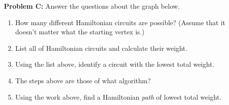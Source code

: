 \documentclass[11pt, oneside]{article}   	%
\begin{document}
	\vfill
	
\textbf{Problem C:} Answer the questions about the graph below.\\
\begin{center}
\end{center}

\begin{enumerate}
\item How many different Hamiltonian circuits are possible? (Assume that it doesn't matter what the starting vertex is.)
\item List all of Hamiltonian circuits and calculate their weight.
\item Using the list above, identify a circuit with the lowest total weight.
\item The steps above are those of what algorithm?
\item Using the work above, find a Hamiltonian \emph{path} of lowest total weight.
\end{enumerate}
\end{document}
